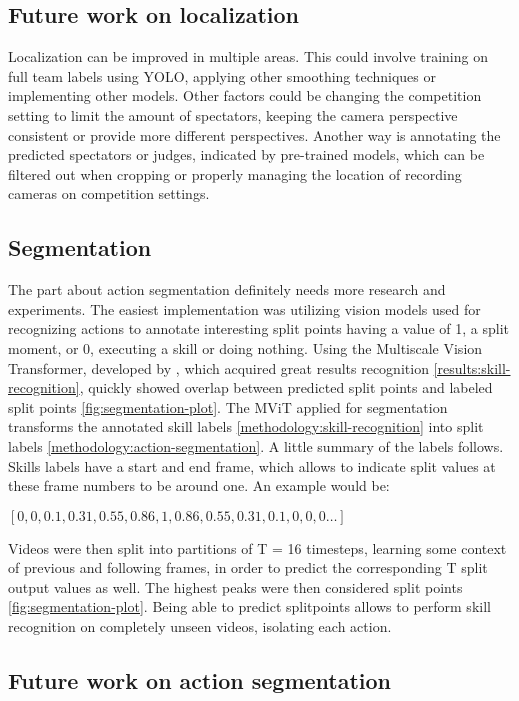 \subsection{Future work on localization}

Localization can be improved in multiple areas. This could involve training on full team labels using YOLO, applying other smoothing techniques or implementing other models. Other factors could be changing the competition setting to limit the amount of spectators, keeping the camera perspective consistent or provide more different perspectives. Another way is annotating the predicted spectators or judges, indicated by pre-trained models, which can be filtered out when cropping or properly managing the location of recording cameras on competition settings.

\subsection{Segmentation}

The part about action segmentation definitely needs more research and experiments. The easiest implementation was utilizing vision models used for recognizing actions to annotate interesting split points having a value of 1, a split moment, or 0, executing a skill or doing nothing. Using the Multiscale Vision Transformer, developed by \autocite{Fan2021}, which acquired great results recognition \ref{results:skill-recognition}, quickly showed overlap between predicted split points and labeled split points \ref{fig:segmentation-plot}.
The MViT applied for segmentation transforms the annotated skill labels \ref{methodology:skill-recognition} into split labels \ref{methodology:action-segmentation}. A little summary of the labels follows. Skills labels have a start and end frame, which allows to indicate split values at these frame numbers to be around one. An example would be:

\(
[0, 0, 0.1, 0.31, 0.55, 0.86, 1, 0.86, 0.55, 0.31, 0.1, 0, 0, 0 \dots]
\)

Videos were then split into partitions of T = 16 timesteps, learning some context of previous and following frames, in order to predict the corresponding T split output values as well. The highest peaks were then considered split points \ref{fig:segmentation-plot}.
Being able to predict splitpoints allows to perform skill recognition on completely unseen videos, isolating each action.

\subsection{Future work on action segmentation}

